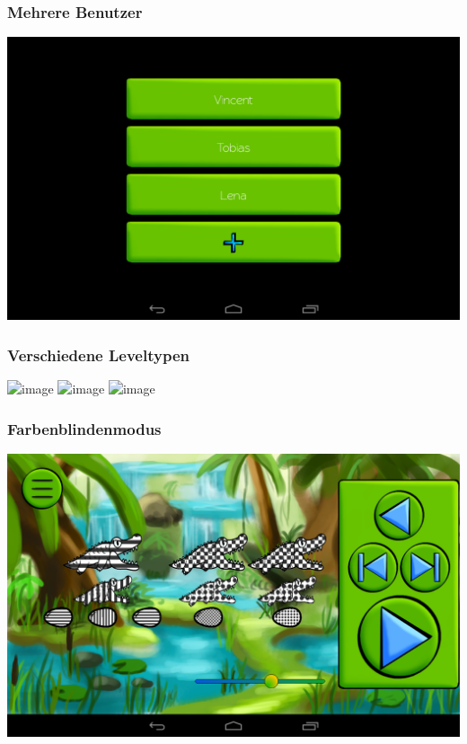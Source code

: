 \documentclass[t]{beamer}
\begin{document}
\begin{frame}
	\frametitle{Mehrere Benutzer}
	\includegraphics[width=\textwidth]{images/screenshots/users}
\end{frame}

\begin{frame}
	\frametitle{Verschiedene Leveltypen}
	\includegraphics<1>[width=\textwidth]{images/screenshots/packages}
	\includegraphics<2>[width=\textwidth]{images/screenshots/levels}
	\includegraphics<3>[width=\textwidth]{images/screenshots/multiple_choice}
\end{frame}

\begin{frame}
	\frametitle{Farbenblindenmodus}
	\includegraphics[width=\textwidth]{images/screenshots/colorblind}
\end{frame}
\end{document}
